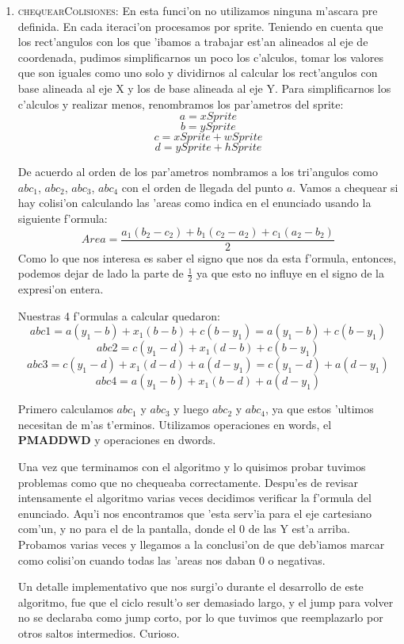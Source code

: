 \begin{enumerate}
\item \textsc{chequearColisiones}:
En esta funci'on no utilizamos ninguna m'ascara pre definida. En cada iteraci'on
procesamos por sprite. Teniendo en cuenta que los rect'angulos con los que
'ibamos a trabajar est'an alineados al eje de coordenada, pudimos simplificarnos
un poco los c'alculos, tomar los valores que son iguales como uno solo y
dividirnos al calcular los rect'angulos con base alineada al eje X y los de base
alineada al eje Y.
Para simplificarnos los c'alculos y realizar menos, renombramos los par'ametros
del sprite:
$$a = xSprite$$
$$b = ySprite$$
$$c = xSprite + wSprite$$
$$d = ySprite + hSprite$$

De acuerdo al orden de los par'ametros nombramos a los tri'angulos como $abc_1$,
$abc_2$, $abc_3$, $abc_4$ con el orden de llegada del punto $a$. Vamos a
chequear si hay colisi'on calculando las 'areas como indica en el enunciado
usando la siguiente f'ormula:
$$Area= \frac{a_1(b_2-c_2) + b_1(c_2-a_2) + c_1(a_2-b_2)}{2}$$
Como lo que nos interesa es saber el signo que nos da esta f'ormula, entonces,
podemos dejar de lado la parte de $\frac{1}{2}$ ya que esto no influye en el
signo de la expresi'on entera.

Nuestras 4 f'ormulas a calcular quedaron:
$$abc1 = a(y_1 - b) + x_1(b - b) + c(b - y_1) = a(y_1 - b) + c(b - y_1)$$
$$abc2 = c(y_1 - d) + x_1(d - b) + c(b - y_1)$$
$$abc3 = c(y_1 - d) + x_1(d - d) + a(d - y_1) = c(y_1 - d) + a(d - y_1)$$
$$abc4 = a(y_1 - b) + x_1(b - d) + a(d - y_1)$$

Primero calculamos $abc_1$ y $abc_3$ y luego $abc_2$ y $abc_4$, ya que estos
'ultimos necesitan de m'as t'erminos. Utilizamos operaciones en words, el
\textbf{PMADDWD} y operaciones en dwords.

Una vez que terminamos con el algoritmo y lo quisimos probar tuvimos problemas
como que no chequeaba correctamente. Despu'es de revisar intensamente el
algoritmo varias veces decidimos verificar la f'ormula del enunciado. Aqu'i nos
encontramos que 'esta serv'ia para el eje cartesiano com'un, y no para el de la
pantalla, donde el 0 de las Y est'a arriba. Probamos varias veces y llegamos a
la conclusi'on de que deb'iamos marcar como colisi'on cuando todas las 'areas nos
daban 0 o negativas.

Un detalle implementativo que nos surgi'o durante el desarrollo de este
algoritmo, fue que el ciclo result'o ser demasiado largo, y el jump para volver
no se declaraba como jump corto, por lo que tuvimos que reemplazarlo por otros
saltos intermedios. Curioso.



\end{enumerate}
